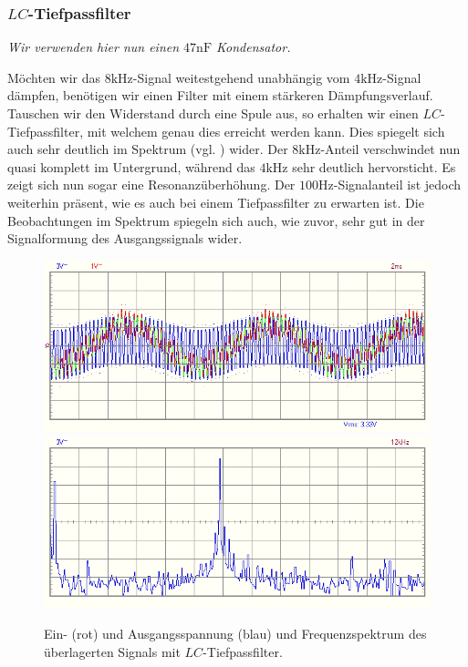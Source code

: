 \newpage
\subsubsection*{$LC$-Tiefpassfilter}

\small{\textrightarrow\textit{Wir verwenden hier nun einen $47\si{\nano\farad}$ Kondensator.}}
\normalsize

Möchten wir das $8\si{\kilo\hertz}$-Signal weitestgehend unabhängig vom $4\si{\kilo\hertz}$-Signal dämpfen, benötigen wir einen Filter mit einem stärkeren Dämpfungsverlauf. Tauschen wir den Widerstand durch eine Spule aus, so erhalten wir einen $LC$-Tiefpassfilter, mit welchem genau dies erreicht werden kann. Dies spiegelt sich auch sehr deutlich im Spektrum (vgl. ) wider. Der $8\si{\kilo\hertz}$-Anteil verschwindet nun quasi komplett im Untergrund, während das $4\si{\kilo\hertz}$ sehr deutlich hervorsticht. Es zeigt sich nun sogar eine Resonanzüberhöhung. Der $100\si{\hertz}$-Signalanteil ist jedoch weiterhin präsent, wie es auch bei einem Tiefpassfilter zu erwarten ist. Die Beobachtungen im Spektrum spiegeln sich auch, wie zuvor, sehr gut in der Signalformung des Ausgangssignals wider.

\begin{figure}[H]
  \centering
  \includegraphics[width=.8\textwidth]{files/aufgabe8_teil2_lc_tiefpass_oszi.png}
  \includegraphics[width=.8\textwidth]{files/aufgabe8_teil2_lc_tiefpass_spectrum.png}
  \caption{Ein- (rot) und Ausgangsspannung (blau) und Frequenzspektrum des überlagerten Signals mit $LC$-Tiefpassfilter.}
  \label{fig:aufgabe8_teil2_lc_tiefpass}
\end{figure}

